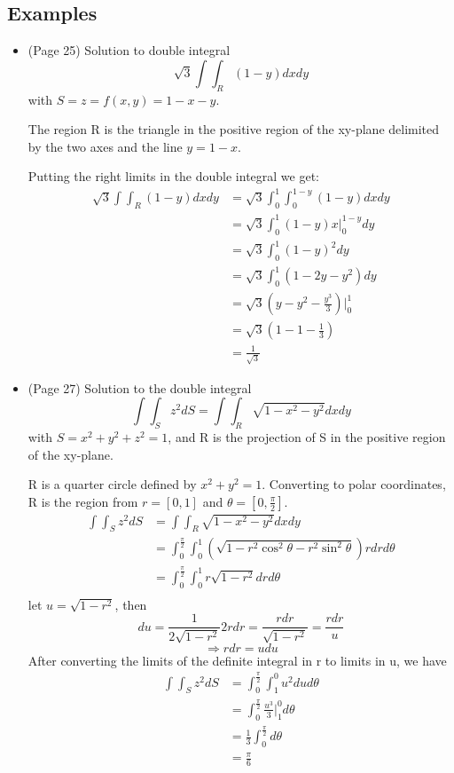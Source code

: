 \documentclass{article}
\begin{document}
\subsection*{Examples}
\begin{itemize}
    \item (Page 25) Solution to double integral
    \[ \sqrt{3}\int\int_R (1-y) dxdy \]
    with $S = z = f(x,y) = 1-x-y$.

    The region R is the triangle in the positive region of the xy-plane
    delimited by the two axes and the line $y = 1-x$.

    Putting the right limits in the double integral we get:
    \begin{align*}
    \sqrt{3}\int\int_R (1-y) dxdy &= \sqrt{3}\int_0^1\int_0^{1-y} (1-y) dxdy \\
    &= \sqrt{3}\int_0^1 (1-y)x \big|_0^{1-y} dy \\
    &= \sqrt{3}\int_0^1 (1-y)^2 dy \\
    &= \sqrt{3}\int_0^1 (1-2y-y^2) dy \\
    &= \sqrt{3}(y-y^2-\frac{y^3}{3}) \big|_0^1 \\
    &= \sqrt{3}(1-1-\frac{1}{3}) \\
    &= \frac{1}{\sqrt{3}}
    \end{align*}

    \item (Page 27) Solution to the double integral
    \[ \int\int_S z^2dS = \int\int_R \sqrt{1-x^2-y^2}dxdy\]
    with $S = x^2+y^2+z^2 = 1$, and R is the projection of S
    in the positive region of the xy-plane.

    R is a quarter circle defined by $x^2+y^2=1$. Converting to
    polar coordinates, R is the region from $r = [0,1]$ and
    $\theta = [0, \frac{\pi}{2}]$.
    \begin{align*}
        \int\int_S z^2dS &= \int\int_R \sqrt{1-x^2-y^2}dxdy \\
        &= \int_0^\frac{\pi}{2}\int_0^1 (\sqrt{1-r^2\cos^2\theta-r^2\sin^2\theta})rdrd\theta \\
        &= \int_0^\frac{\pi}{2}\int_0^1 r\sqrt{1-r^2}drd\theta \\
    \end{align*}
    let $u = \sqrt{1-r^2}$, then
    \[ du = \frac{1}{2\sqrt{1-r^2}}2rdr = \frac{rdr}{\sqrt{1-r^2}} = \frac{rdr}{u} \]
    \[ \Rightarrow rdr = udu \]
    After converting the limits of the definite integral in r to limits in u, we have
    \begin{align*}
        \int\int_S z^2dS &= \int_0^\frac{\pi}{2}\int_1^0 u^2dud\theta \\
        &= \int_0^\frac{\pi}{2} \frac{u^3}{3} \bigg|_{1}^{0} d\theta \\
        &= \frac{1}{3} \int_0^\frac{\pi}{2}d\theta \\
        &= \frac{\pi}{6} \\
    \end{align*}


\end{itemize}
\end{document}
